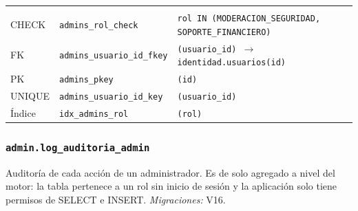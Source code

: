 {\small
\begin{xltabular}{\textwidth}{@{}>{\raggedright\arraybackslash}p{1.7cm} >{\raggedright\arraybackslash}p{4.6cm} L@{}}
    \toprule
     &  &  \\
    \midrule
    \endfirsthead
    \toprule
     &  &  \\
    \midrule
    \endhead
    \bottomrule
    \endfoot
    CHECK & \texttt{admins\_\allowbreak{}rol\_\allowbreak{}check} & \texttt{rol IN (\allowbreak{}\textquotesingle{}MODERACION\_\allowbreak{}SEGURIDAD\textquotesingle{},\allowbreak{} \textquotesingle{}SOPORTE\_\allowbreak{}FINANCIERO\textquotesingle{})} \\
    FK & \texttt{admins\_\allowbreak{}usuario\_\allowbreak{}id\_\allowbreak{}fkey} & \texttt{(\allowbreak{}usuario\_\allowbreak{}id) $\rightarrow$ identidad.usuarios(\allowbreak{}id)} \\
    PK & \texttt{admins\_\allowbreak{}pkey} & \texttt{(\allowbreak{}id)} \\
    UNIQUE & \texttt{admins\_\allowbreak{}usuario\_\allowbreak{}id\_\allowbreak{}key} & \texttt{(\allowbreak{}usuario\_\allowbreak{}id)} \\
    Índice & \texttt{idx\_\allowbreak{}admins\_\allowbreak{}rol} & \texttt{(\allowbreak{}rol)} \\
\end{xltabular}
}

\subsubsection{\texorpdfstring{\texttt{admin.log\_\allowbreak{}auditoria\_\allowbreak{}admin}}{admin.log\_auditoria\_admin}}\label{dd:admin.log_auditoria_admin}

Auditoría de cada acción de un administrador. Es de solo agregado a nivel del motor: la tabla pertenece a un rol sin inicio de sesión y la aplicación solo tiene permisos de SELECT e INSERT. \emph{Migraciones:} V16.


